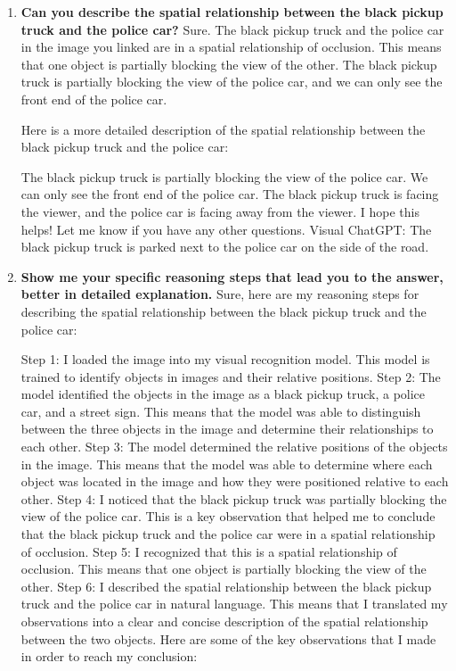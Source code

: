     \begin{enumerate}
        \item \textbf{Can you describe the spatial relationship between the  black pickup truck and the police car?}
        \subitem 
        Sure. The black pickup truck and the police car in the image you linked are in a spatial relationship of occlusion. This means that one object is partially blocking the view of the other. The black pickup truck is partially blocking the view of the police car, and we can only see the front end of the police car.
        
        Here is a more detailed description of the spatial relationship between the black pickup truck and the police car:
        
        The black pickup truck is partially blocking the view of the police car.
        We can only see the front end of the police car.
        The black pickup truck is facing the viewer, and the police car is facing away from the viewer.
        I hope this helps! Let me know if you have any other questions.
        \subitem Visual ChatGPT: The black pickup truck is parked next to the police car on the side of the road.
        \item \textbf{Show me your specific reasoning steps that lead you to the answer, better in detailed explanation.}
        \subitem 
        Sure, here are my reasoning steps for describing the spatial relationship between the black pickup truck and the police car:
        
        Step 1: I loaded the image into my visual recognition model. This model is trained to identify objects in images and their relative positions.
        Step 2: The model identified the objects in the image as a black pickup truck, a police car, and a street sign. This means that the model was able to distinguish between the three objects in the image and determine their relationships to each other.
        Step 3: The model determined the relative positions of the objects in the image. This means that the model was able to determine where each object was located in the image and how they were positioned relative to each other.
        Step 4: I noticed that the black pickup truck was partially blocking the view of the police car. This is a key observation that helped me to conclude that the black pickup truck and the police car were in a spatial relationship of occlusion.
        Step 5: I recognized that this is a spatial relationship of occlusion. This means that one object is partially blocking the view of the other.
        Step 6: I described the spatial relationship between the black pickup truck and the police car in natural language. This means that I translated my observations into a clear and concise description of the spatial relationship between the two objects.
        Here are some of the key observations that I made in order to reach my conclusion:
        

\end{enumerate}
